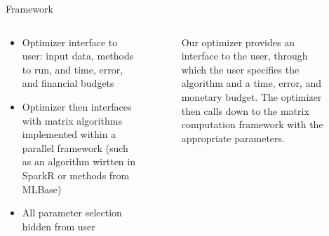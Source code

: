 \documentclass[final]{beamer}
\begin{document}
{\begin{frame}{}
\begin{center}
\begin{columns}[t]
\begin{column}{0.32\textwidth}
    \begin{block}{\huge Framework}
\vspace{.5cm}
\begin{columns}[t]
\begin{column}{0.4\textwidth}
\begin{itemize}
\item Optimizer interface to user: input data, methods to run, and time, error, and financial budgets
\item Optimizer then interfaces with matrix algorithms implemented within a parallel framework (such as an algorithm wirtten in SparkR or methods from MLBase)
\item All parameter selection hidden from user
\end{itemize}    
\end{column}
\begin{column}{.4\textwidth}
\begin{center}
\begin{figure}
\caption[width=\textwidth]{Our optimizer provides an interface to the user, through which the user specifies the algorithm and a time, error, and monetary budget. The optimizer then calls down to the matrix computation framework with the appropriate parameters.}
\end{figure}
\end{center}
\end{column}
\end{columns}
\end{block}


\end{column}
\end{columns}
\end{center}
\end{frame}}
\end{document}
